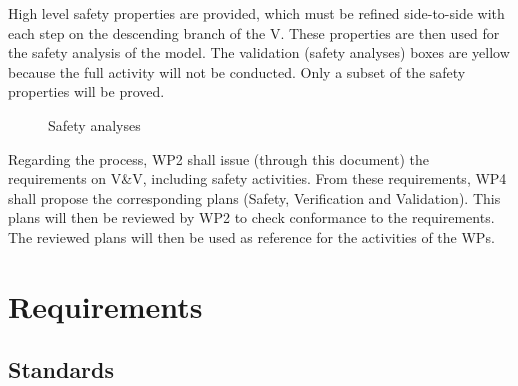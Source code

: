 \documentclass{template/openetcs_article}
\begin{document}
High level safety properties are provided, which must be refined side-to-side with each step on the 
descending branch of the V. These properties are then used for the safety analysis of the model. The 
validation (safety analyses) boxes are yellow because the full activity will not be conducted. Only 
a subset of the safety properties will be proved.

\begin{figure}
  \centering
  \caption{Safety analyses}
  \label{fig:safety_process}
\end{figure}

Regarding the process, WP2 shall issue (through this document) the requirements on V\&V, including
safety activities. From these requirements, WP4 shall propose the corresponding plans (Safety,
Verification and Validation). This plans will then be reviewed by WP2 to check conformance to the 
requirements. The reviewed plans will then be used as reference for the activities of the WPs.


\section{Requirements}
\subsection{Standards}
\label{standards}
\end{document}
